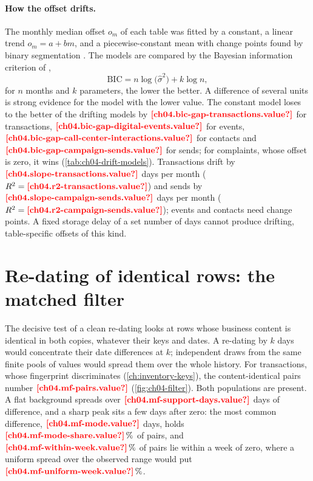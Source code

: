 

\paragraph{How the offset drifts.} The monthly median offset $o_m$ of each table was fitted by a constant,
a linear trend $o_m = a + bm$, and a piecewise-constant mean with change points found by binary segmentation
\autocite{scott1974,truong2020}. The models are compared by the Bayesian information criterion of
\textcite{schwarz1978},
\begin{equation}\label{eq:bic}
  \mathrm{BIC} = n \log\bigl(\hat\sigma^2\bigr) + k \log n,
\end{equation}
for $n$ months and $k$ parameters, the lower the better. A difference of several units is strong evidence for the
model with the lower value. The constant model loses to the better of the drifting models by
$\est{ch04.bic-gap-transactions}{value}$ for transactions, $\est{ch04.bic-gap-digital-events}{value}$ for events,
$\est{ch04.bic-gap-call-center-interactions}{value}$ for contacts and $\est{ch04.bic-gap-campaign-sends}{value}$ for
sends; for complaints, whose offset is zero, it wins (\cref{tab:ch04-drift-models}). Transactions drift by
$\est{ch04.slope-transactions}{value}$ days per month ($R^2 = \est{ch04.r2-transactions}{value}$) and sends by
$\est{ch04.slope-campaign-sends}{value}$ days per month ($R^2 = \est{ch04.r2-campaign-sends}{value}$); events and
contacts need change points. A fixed storage delay of a set number of days cannot produce drifting, table-specific
offsets of this kind.



\section{Re-dating of identical rows: the matched filter}\label{sec:time-filter}

The decisive test of a clean re-dating looks at rows whose business content is identical in both copies, whatever
their keys and dates. A re-dating by $k$ days would concentrate their date differences at $k$; independent draws from
the same finite pools of values would spread them over the whole history. For transactions, whose fingerprint
discriminates (\cref{ch:inventory-keys}), the content-identical pairs number $\est{ch04.mf-pairs}{value}$
(\cref{fig:ch04-filter}). Both populations are present. A flat background spreads over
$\est{ch04.mf-support-days}{value}$ days of difference, and a sharp peak sits a few days after zero: the most common
difference, $\est{ch04.mf-mode}{value}$ days, holds $\est{ch04.mf-mode-share}{value}\,\%$ of pairs, and
$\est{ch04.mf-within-week}{value}\,\%$ of pairs lie within a week of zero, where a uniform spread over the observed
range would put $\est{ch04.mf-uniform-week}{value}\,\%$.

